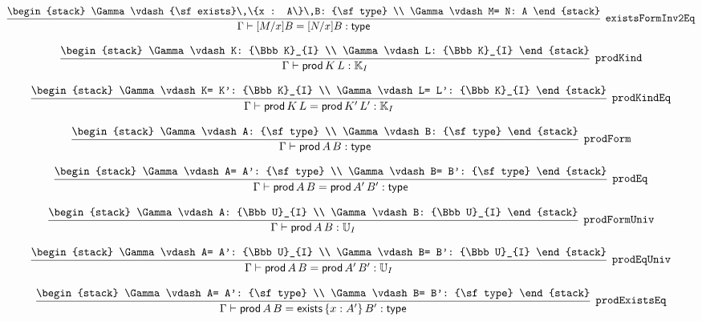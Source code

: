 \[
\infer[{\tt existsFormInv2Eq}]{\Gamma \vdash [M/x]B= [N/x]B: {\sf type}}{
\begin{stack}
\Gamma \vdash {\sf exists}\,\{x : A\}\,B: {\sf type}
\\
\Gamma \vdash M= N: A
\end{stack}}
\]

\[
\infer[{\tt prodKind}]{\Gamma \vdash {\sf prod}\,K\,L: {\Bbb K}_{I}}{
\begin{stack}
\Gamma \vdash K: {\Bbb K}_{I}
\\
\Gamma \vdash L: {\Bbb K}_{I}
\end{stack}}
\]

\[
\infer[{\tt prodKindEq}]{\Gamma \vdash {\sf prod}\,K\,L= {\sf prod}\,K'\,L': {\Bbb K}_{I}}{
\begin{stack}
\Gamma \vdash K= K': {\Bbb K}_{I}
\\
\Gamma \vdash L= L': {\Bbb K}_{I}
\end{stack}}
\]

\[
\infer[{\tt prodForm}]{\Gamma \vdash {\sf prod}\,A\,B: {\sf type}}{
\begin{stack}
\Gamma \vdash A: {\sf type}
\\
\Gamma \vdash B: {\sf type}
\end{stack}}
\]

\[
\infer[{\tt prodEq}]{\Gamma \vdash {\sf prod}\,A\,B= {\sf prod}\,A'\,B': {\sf type}}{
\begin{stack}
\Gamma \vdash A= A': {\sf type}
\\
\Gamma \vdash B= B': {\sf type}
\end{stack}}
\]

\[
\infer[{\tt prodFormUniv}]{\Gamma \vdash {\sf prod}\,A\,B: {\Bbb U}_{I}}{
\begin{stack}
\Gamma \vdash A: {\Bbb U}_{I}
\\
\Gamma \vdash B: {\Bbb U}_{I}
\end{stack}}
\]

\[
\infer[{\tt prodEqUniv}]{\Gamma \vdash {\sf prod}\,A\,B= {\sf prod}\,A'\,B': {\Bbb U}_{I}}{
\begin{stack}
\Gamma \vdash A= A': {\Bbb U}_{I}
\\
\Gamma \vdash B= B': {\Bbb U}_{I}
\end{stack}}
\]

\[
\infer[{\tt prodExistsEq}]{\Gamma \vdash {\sf prod}\,A\,B= {\sf exists}\,\{x : A'\}\,B': {\sf type}}{
\begin{stack}
\Gamma \vdash A= A': {\sf type}
\\
\Gamma \vdash B= B': {\sf type}
\end{stack}}
\]


